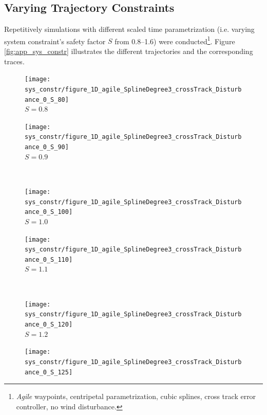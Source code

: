 \subsection{Varying Trajectory Constraints}
\label{sub:app_varying_sys_constraints}
Repetitively simulations with different scaled time parametrization (i.e. varying system constraint's safety factor $S$ from \numrange{0.8}{1.6}) were conducted\footnote{\textit{Agile} waypoints, centripetal parametrization, cubic splines, cross track error controller, no wind disturbance.}. Figure \ref{fig:app_sys_constr} illustrates the different trajectories and the corresponding traces.

\begin{figure}[H]
  \centering
  \begin{minipage}[t]{0.48\textwidth}
    \centering
    \texttt{[image: sys\_constr/figure\_1D\_agile\_SplineDegree3\_crossTrack\_Disturbance\_0\_S\_80]}
  \\ $S=0.8$
  \end{minipage}
  \begin{minipage}[t]{0.48\textwidth}
    \centering
    \texttt{[image: sys\_constr/figure\_1D\_agile\_SplineDegree3\_crossTrack\_Disturbance\_0\_S\_90]}
  \\ $S=0.9$
  \end{minipage} \\ \hspace{5pt}
  \begin{minipage}[t]{0.48\textwidth}
    \centering
    \texttt{[image: sys\_constr/figure\_1D\_agile\_SplineDegree3\_crossTrack\_Disturbance\_0\_S\_100]}
  \\ $S=1.0$
  \end{minipage}
  \begin{minipage}[t]{0.48\textwidth}
    \centering
    \texttt{[image: sys\_constr/figure\_1D\_agile\_SplineDegree3\_crossTrack\_Disturbance\_0\_S\_110]}
  \\ $S=1.1$
  \end{minipage}\\ \hspace{5pt}
  \begin{minipage}[t]{0.48\textwidth}
    \centering
    \texttt{[image: sys\_constr/figure\_1D\_agile\_SplineDegree3\_crossTrack\_Disturbance\_0\_S\_120]}
  \\ $S=1.2$
  \end{minipage}
  \begin{minipage}[t]{0.48\textwidth}
    \centering
    \texttt{[image: sys\_constr/figure\_1D\_agile\_SplineDegree3\_crossTrack\_Disturbance\_0\_S\_125]}

\end{minipage}
\end{figure}
